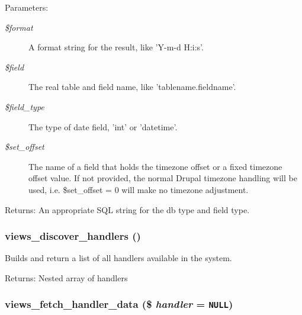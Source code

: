 \begin{Desc}
\item[Parameters:]
\begin{description}
\item[{\em \$format}]A format string for the result, like 'Y-m-d H:i:s'. \item[{\em \$field}]The real table and field name, like 'tablename.fieldname'. \item[{\em \$field\_\-type}]The type of date field, 'int' or 'datetime'. \item[{\em \$set\_\-offset}]The name of a field that holds the timezone offset or a fixed timezone offset value. If not provided, the normal Drupal timezone handling will be used, i.e. \$set\_\-offset = 0 will make no timezone adjustment. \end{description}
\end{Desc}
\begin{Desc}
\item[Returns:]An appropriate SQL string for the db type and field type. \end{Desc}
\hypertarget{handlers_8inc_5723616d83060c0a1e13d8e8f37c948d}{
\subsubsection[{views\_\-discover\_\-handlers}]{\setlength{\rightskip}{0pt plus 5cm}views\_\-discover\_\-handlers ()}}
\label{handlers_8inc_5723616d83060c0a1e13d8e8f37c948d}


Builds and return a list of all handlers available in the system.

\begin{Desc}
\item[Returns:]Nested array of handlers \end{Desc}
\hypertarget{handlers_8inc_507fd16f1a3635bf959aaf54fef06cef}{
\subsubsection[{views\_\-fetch\_\-handler\_\-data}]{\setlength{\rightskip}{0pt plus 5cm}views\_\-fetch\_\-handler\_\-data (\$ {\em handler} = {\tt NULL})}}
\label{handlers_8inc_507fd16f1a3635bf959aaf54fef06cef}


